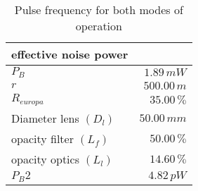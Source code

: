 \begin{table}[H]
\centering
\caption{Pulse frequency for both modes of operation}
\label{tab:effective_noise_power}
\begin{tabular}{|l|r|}\hline
    \textbf{effective noise power} & \\
    \hline 
    $P_B$ & $1.89\,m W$ \\
    $r$ & $500.00\, m$ \\
    $R_{europa}$ & $35.00\, \%$ \\
    Diameter lens $(D_l)$ & $50.00\,m m$ \\
    opacity filter $(L_f)$ & $50.00\, \%$ \\
    opacity optics $(L_l)$ & $14.60\, \%$ \\
    $P_B2$ & $4.82\,p W$ \\
    \hline 
\end{tabular}
\end{table}
